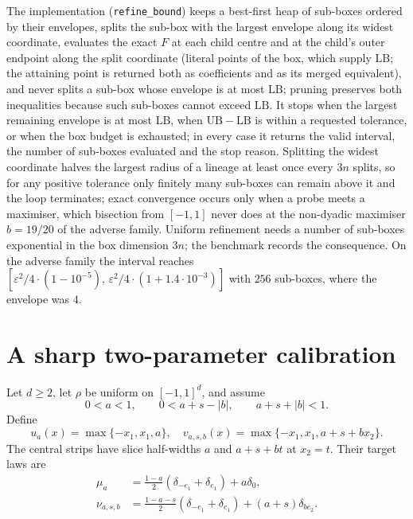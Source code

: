 \documentclass[11pt]{article}
\theoremstyle{remark}
\begin{document}
The implementation (\texttt{refine\_bound}) keeps a best-first heap of
sub-boxes ordered by their envelopes, splits the sub-box with the largest
envelope along its widest coordinate, evaluates the exact $F$ at each child
centre and at the child's outer endpoint along the split coordinate (literal
points of the box, which supply $\mathrm{LB}$; the attaining point is returned
both as coefficients and as its merged equivalent), and
never splits a sub-box whose envelope is at most $\mathrm{LB}$; pruning
preserves both inequalities because such sub-boxes cannot exceed
$\mathrm{LB}$. It stops when the largest remaining envelope is at most
$\mathrm{LB}$, when $\mathrm{UB}-\mathrm{LB}$ is within a requested tolerance,
or when the box budget is exhausted; in every case it returns the valid
interval, the number of sub-boxes evaluated and the stop reason. Splitting the
widest coordinate halves the largest radius of a lineage at least once every
$3n$ splits, so for any positive tolerance only finitely many sub-boxes can
remain above it and the loop terminates; exact convergence occurs only when a
probe meets a maximiser, which bisection from $[-1,1]$ never does at the
non-dyadic maximiser $b=19/20$ of the adverse family. Uniform refinement needs a number of
sub-boxes exponential in the box dimension $3n$; the benchmark records the
consequence. On the adverse family the interval reaches
$[\varepsilon^2/4\cdot(1-10^{-5}),\,\varepsilon^2/4\cdot(1+1.4\cdot10^{-3})]$
with $256$ sub-boxes, where the envelope was $4$.

\section{A sharp two-parameter calibration}\label{sec:tilt}
Let $d\geq2$, let $\rho$ be uniform on $[-1,1]^d$, and assume
\begin{equation}\label{eq:admissible}
 0<a<1,\qquad 0<a+s-|b|,\qquad a+s+|b|<1.
\end{equation}
Define
\[
 u_a(x)=\max\{-x_1,x_1,a\},\quad
 v_{a,s,b}(x)=\max\{-x_1,x_1,a+s+bx_2\}.
\]
The central strips have slice half-widths $a$ and $a+s+bt$ at $x_2=t$.
Their target laws are
\begin{align*}
 \mu_a&=\tfrac{1-a}{2}(\delta_{-e_1}+\delta_{e_1})+a\delta_0,\\
 \nu_{a,s,b}&=\tfrac{1-a-s}{2}(\delta_{-e_1}+\delta_{e_1})+(a+s)\delta_{be_2}.
\end{align*}
\end{document}
